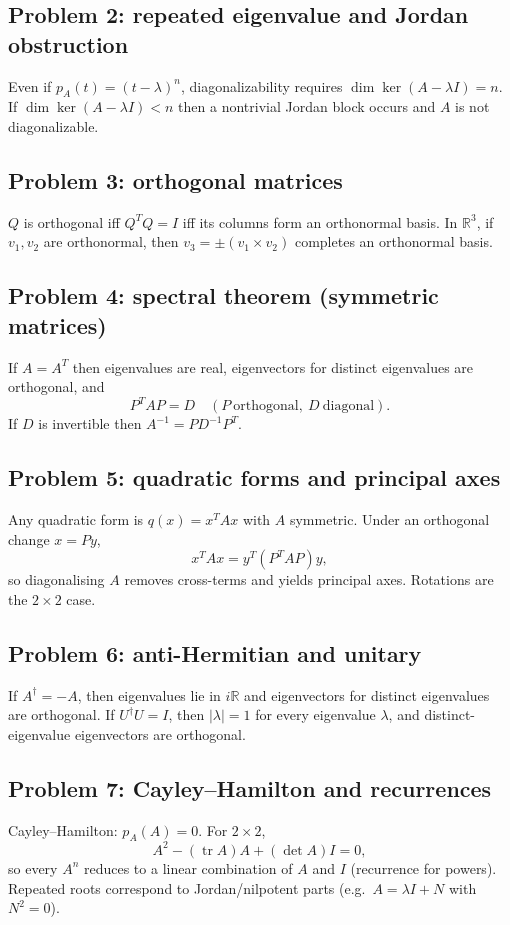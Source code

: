 \documentclass[12pt,a4paper]{article}
\DeclareMathOperator{\tr}{tr}
\theoremstyle{plain}
\theoremstyle{definition}      %
\begin{document}
\subsection*{Problem 2: repeated eigenvalue and Jordan obstruction}
Even if $p_A(t)=(t-\lambda)^n$, diagonalizability requires $\dim\ker(A-\lambda I)=n$.
If $\dim\ker(A-\lambda I)<n$ then a nontrivial Jordan block occurs and $A$ is not diagonalizable.

\subsection*{Problem 3: orthogonal matrices}
$Q$ is orthogonal iff $Q^TQ=I$ iff its columns form an orthonormal basis.
In $\mathbb R^3$, if $v_1,v_2$ are orthonormal, then $v_3=\pm(v_1\times v_2)$ completes an orthonormal basis.

\subsection*{Problem 4: spectral theorem (symmetric matrices)}
If $A=A^T$ then eigenvalues are real, eigenvectors for distinct eigenvalues are orthogonal, and
\[
P^TAP=D \quad (P\ \text{orthogonal},\ D\ \text{diagonal}).
\]
If $D$ is invertible then $A^{-1}=PD^{-1}P^T$.

\subsection*{Problem 5: quadratic forms and principal axes}
Any quadratic form is $q(x)=x^TAx$ with $A$ symmetric. Under an orthogonal change $x=Py$,
\[
x^TAx = y^T(P^TAP)y,
\]
so diagonalising $A$ removes cross-terms and yields principal axes. Rotations are the $2\times2$ case.

\subsection*{Problem 6: anti-Hermitian and unitary}
If $A^\dagger=-A$, then eigenvalues lie in $i\mathbb R$ and eigenvectors for distinct eigenvalues are orthogonal.
If $U^\dagger U=I$, then $|\lambda|=1$ for every eigenvalue $\lambda$, and distinct-eigenvalue eigenvectors are orthogonal.

\subsection*{Problem 7: Cayley--Hamilton and recurrences}
Cayley--Hamilton: $p_A(A)=0$. For $2\times2$,
\[
A^2-(\tr A)A+(\det A)I=0,
\]
so every $A^n$ reduces to a linear combination of $A$ and $I$ (recurrence for powers).
Repeated roots correspond to Jordan/nilpotent parts (e.g.\ $A=\lambda I+N$ with $N^2=0$).
\end{document}
